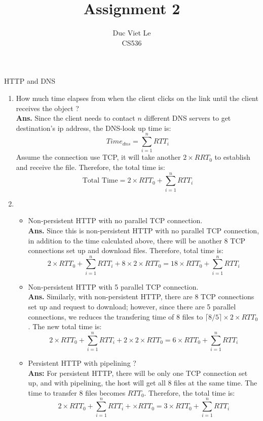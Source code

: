 \documentclass[11pt]{article}
\newenvironment{problem}[2][Problem]{\begin{trivlist}
\item[\hskip \labelsep {\bfseries #1}\hskip \labelsep {\bfseries #2.}]}{\end{trivlist}}
\begin{document}
\title{Assignment 2}
\author{Duc Viet Le\\
CS536}
 
\maketitle
 
\begin{problem}{1}
HTTP and DNS
\end{problem}
\begin{enumerate}
	\item[a.] How much time elapses from when the client clicks on the link until the client receives the object ?
	\\
	\textbf{Ans.} Since the client needs to contact $n$ different DNS servers to get destination's ip address, the DNS-look up time is:
	$$Time_{dns} = \sum_{i=1}^n RTT_i$$
	Assume the connection use TCP, it will take another  $2\times RRT_0$ to establish and receive the file. Therefore, the total time is:
	$$\text{Total Time} = 2\times RTT_0 + \sum_{i=1}^n RTT_i$$
	\item[b.]
	\begin{itemize}
		\item Non-persistent HTTP with no parallel TCP connection.
		\\
		\textbf{Ans.} Since this is non-persistent HTTP with no parallel TCP connection, in addition to the time calculated above, there will be another 8 TCP connections set up and download files. Therefore, total time is:
		$$2\times RTT_0 + \sum_{i=1}^n RTT_i + 8\times 2 \times RTT_0 = 18\times RTT_0 + \sum_{i=1}^n RTT_i$$
		\item Non-persistent HTTP with 5 parallel TCP connection.
		\\\textbf{Ans.} Similarly, with non-persistent HTTP, there are 8 TCP connections set up and request to download; however, since there are 5 parallel connections, we reduces the transfering time of 8 files to $\lceil 8/5 \rceil \times 2 \times RTT_0$. The new total time is:
		$$2\times RTT_0 + \sum_{i=1}^n RTT_i + 2\times 2 \times RTT_0 = 6\times RTT_0 + \sum_{i=1}^n RTT_i$$
		\item Persistent HTTP with pipelining ?
		\\
		\textbf{Ans:} For persistent HTTP, there will be only one TCP connection set up, and with pipelining, the host will get all 8 files at the same time. The time to transfer 8 files becomes $RTT_0$. Therefore, the total time is:
		$$2\times RTT_0 + \sum_{i=1}^n RTT_i + \times RTT_0 = 3\times RTT_0 + \sum_{i=1}^n RTT_i$$
	\end{itemize}
\end{enumerate}
\end{document}
